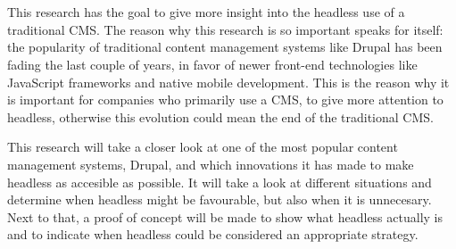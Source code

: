 
\chapter*{}
This research has the goal to give more insight into the headless use of a traditional CMS. The reason why this research is so important speaks for itself: the popularity of traditional content management systems like Drupal has been fading the last couple of years, in favor of newer front-end technologies like JavaScript frameworks and native mobile development. This is the reason why it is important for companies who primarily use a CMS, to give more attention to headless, otherwise this evolution could mean the end of the traditional CMS.

This research will take a closer look at one of the most popular content management systems, Drupal, and which innovations it has made to make headless as accesible as possible. It will take a look at different situations and determine when headless might be favourable, but also when it is unnecesary. Next to that, a proof of concept will be made to show what headless actually is and to indicate when headless could be considered an appropriate strategy.
